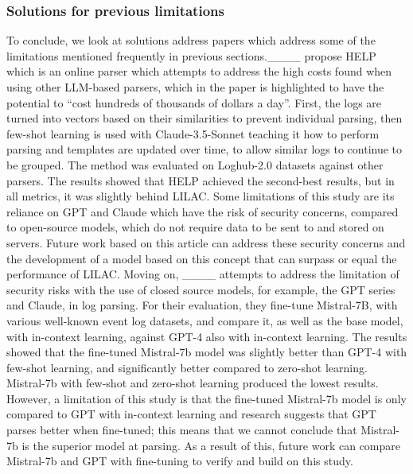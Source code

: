 \subsubsection{Solutions for previous limitations}
To conclude, we look at solutions address papers which address some of the limitations mentioned frequently in previous sections.____ propose HELP which is an online parser which attempts to address the high costs found when using other LLM-based parsers, which in the paper is highlighted to have the potential to ``cost hundreds of thousands of dollars a day''. First, the logs are turned into vectors based on their similarities to prevent individual parsing, then few-shot learning is used with Claude-3.5-Sonnet teaching it how to perform parsing and templates are updated over time, to allow similar logs to continue to be grouped. The method was evaluated on Loghub-2.0 datasets against other parsers. The results showed that HELP achieved the second-best results, but in all metrics, it was slightly behind LILAC. Some limitations of this study are its reliance on GPT and Claude which have the risk of security concerns, compared to open-source models, which do not require data to be sent to and stored on servers. Future work based on this article can address these security concerns and the development of a model based on this concept that can surpass or equal the performance of LILAC. Moving on, ____ attempts to address the limitation of security risks with the use of closed source models, for example, the GPT series and Claude, in log parsing. For their evaluation, they fine-tune Mistral-7B, with various well-known event log datasets, and compare it, as well as the base model, with in-context learning, against GPT-4 also with in-context learning. The results showed that the fine-tuned Mistral-7b model was slightly better than GPT-4 with few-shot learning, and significantly better compared to zero-shot learning. Mistral-7b with few-shot and zero-shot learning produced the lowest results. However, a limitation of this study is that the fine-tuned Mistral-7b model is only compared to GPT with in-context learning and research suggests that GPT parses better when fine-tuned; this means that we cannot conclude that Mistral-7b is the superior model at parsing. As a result of this, future work can compare Mistral-7b and GPT with fine-tuning to verify and build on this study. 

